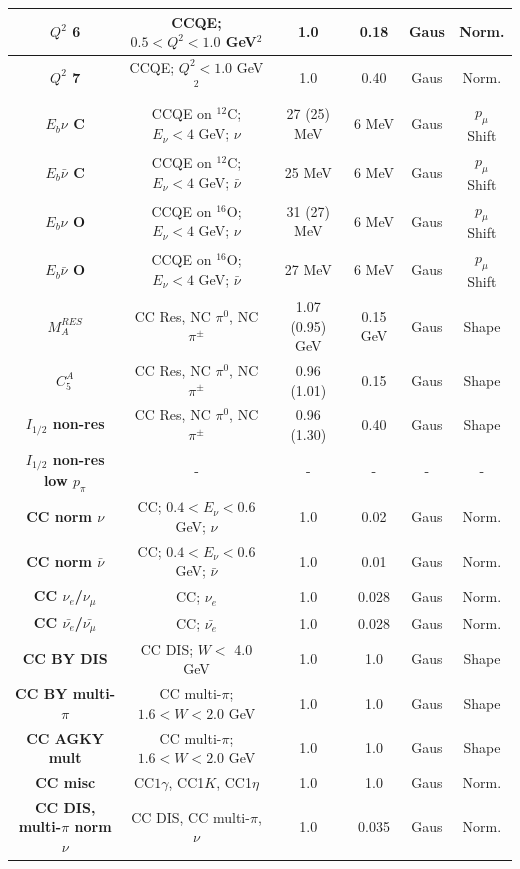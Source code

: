 \begin{center}
\begin{table}
\begin{adjustwidth}{-.9in}{-.9in}
{\begin{tabular}{ c||c|c|c|c|c}
\hline
\textbf{$Q^2$ 6} & CCQE; $0.5<Q^{2}<1.0$ GeV$^{2}$ & 1.0 & 0.18 & Gaus & Norm.\\
\hline
\textbf{$Q^2$ 7} & CCQE; $Q^{2}<1.0$ GeV$^{2}$ & 1.0 & 0.40 & Gaus & Norm.\\
\hline
\textbf{$E_{b} \nu$ C} & CCQE on $^{12}$C; $E_{\nu} < 4$ GeV; $\nu$ & 27 (25) MeV & 6 MeV & Gaus & $p_{\mu}$ Shift\\
\hline
\textbf{$E_{b} \bar{\nu}$ C} & CCQE on $^{12}$C; $E_{\nu} < 4$ GeV; $\bar{\nu}$ & 25 MeV & 6 MeV & Gaus & $p_{\mu}$ Shift\\
\hline
\textbf{$E_{b} \nu$ O} & CCQE on $^{16}$O; $E_{\nu} < 4$ GeV; $\nu$ & 31 (27) MeV & 6 MeV & Gaus & $p_{\mu}$ Shift\\
\hline
\textbf{$E_{b} \bar{\nu}$ O} & CCQE on $^{16}$O; $E_{\nu} < 4$ GeV; $\bar{\nu}$ & 27 MeV & 6 MeV & Gaus & $p_{\mu}$ Shift\\
\hline
\textbf{$M^{RES}_{A}$} & CC Res, NC $\pi^{0}$, NC $\pi^{\pm}$ & 1.07 (0.95) GeV & 0.15 GeV & Gaus & Shape\\
\hline
\textbf{$C^{A}_{5}$} & CC Res, NC $\pi^{0}$, NC $\pi^{\pm}$ & 0.96 (1.01) & 0.15 & Gaus & Shape\\
\hline
\textbf{$I_{1/2}$ non-res} & CC Res, NC $\pi^{0}$, NC $\pi^{\pm}$ & 0.96 (1.30) & 0.40 & Gaus & Shape\\
\hline
\textbf{$I_{1/2}$ non-res low $p_{\pi}$} & - & - & - & - & -\\
\hline
\textbf{CC norm $\nu$} & CC; $0.4 <E_{\nu} < 0.6$ GeV; $\nu$ & 1.0 & 0.02 & Gaus & Norm.\\
\hline
\textbf{CC norm $\bar{\nu}$} & CC; $0.4 <E_{\nu} < 0.6$ GeV; $\bar{\nu}$ & 1.0 & 0.01 & Gaus & Norm.\\
\hline
\textbf{CC $\nu_{e}$/$\nu_{\mu}$} & CC; $\nu_{e}$ & 1.0 & 0.028 & Gaus & Norm.\\
\hline
\textbf{CC $\bar{\nu_{e}}$/$\bar{\nu_{\mu}}$} & CC; $\bar{\nu_{e}}$ & 1.0 & 0.028 & Gaus & Norm.\\
\hline
\textbf{CC BY DIS} & CC DIS; $W<$ 4.0 GeV & 1.0 & 1.0 & Gaus & Shape\\
\hline
\textbf{CC BY multi-$\pi$} & CC multi-$\pi$; $1.6<W<2.0$ GeV & 1.0 & 1.0 & Gaus & Shape\\
\hline
\textbf{CC AGKY mult} & CC multi-$\pi$; $1.6<W<2.0$ GeV & 1.0 & 1.0 & Gaus & Shape\\
\hline
\textbf{CC misc} & CC$1\gamma$, CC1$K$, CC1$\eta$ & 1.0 & 1.0 & Gaus & Norm.\\
\hline
\textbf{CC DIS, multi-$\pi$ norm $\nu$} & CC DIS, CC multi-$\pi$, $\nu$ & 1.0 & 0.035 & Gaus & Norm.\\

\end{tabular}}
\end{adjustwidth}
\end{table}
\end{center}
